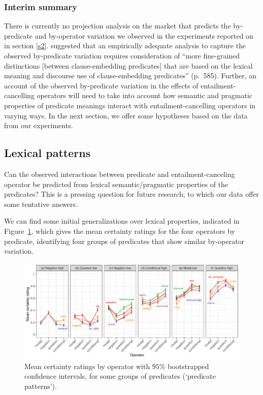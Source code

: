 \documentclass[a4paper,12pt,twoside]{article}
\begin{document}
\subsubsection{Interim summary}

    There is currently no projection analysis on the market that predicts the by-predicate and by-operator variation we observed in the experiments reported on in section \ref{s2}. \citealt{degen_are_2022} suggested that an empirically adequate analysis to capture the observed by-predicate variation requires consideration of ``more fine-grained distinctions [between clause-embedding predicates] that are based on the lexical meaning and discourse use of clause-embedding predicates'' (p.~585). Further, an account of the observed by-predicate variation in the effects of entailment-cancelling operators will need to take into account how semantic and pragmatic properties of predicate meanings interact with entailment-cancelling operators in varying ways. In the next section, we offer some hypotheses based on the data from our experiments.


\subsection{Lexical patterns}\label{s:lex}
    
    Can the observed interactions between predicate and entailment-canceling operator be predicted from lexical semantic/pragmatic properties of the predicates? This is a pressing question for future research, to which our data offer some tentative answers. 
    
    We can find some initial generalizations over lexical properties, indicated in Figure~\ref{fig:patterns}, which gives the mean certainty ratings for the four operators by predicate, identifying four groups of predicates that show similar by-operator variation.
	
	\begin{figure}[ht]
		\centering
		\includegraphics[width=\textwidth]{predicate-profiles.pdf}
		\caption{Mean certainty ratings by operator with $95\%$ bootstrapped confidence intervals, for some groups of predicates (\lq predicate patterns\rq).}
		\label{fig:patterns}
	\end{figure}
\end{document}
